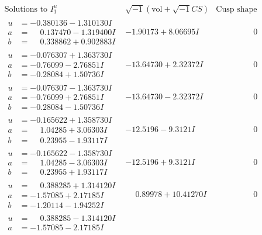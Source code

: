 \documentclass[1p]{elsarticle_modified}
\theoremstyle{definition}
\newcommand{\I}{\sqrt{-1}}
\begin{document}
$$\begin{array}{c|c|c}
\text{Solutions to }I^u_{1}& \I (\text{vol} + \sqrt{-1}CS) & \text{Cusp shape}\\
 \hline 
\begin{aligned}
u &= -0.380136 - 1.310130 I \\
a &= \phantom{-}0.137470 - 1.319400 I \\
b &= \phantom{-}0.338862 + 0.902883 I\end{aligned}
 & -1.90173 + 8.06695 I & \phantom{-0.000000 } 0 \\ \hline\begin{aligned}
u &= -0.076307 + 1.363730 I \\
a &= -0.76099 - 2.76851 I \\
b &= -0.28084 + 1.50736 I\end{aligned}
 & -13.64730 + 2.32372 I & \phantom{-0.000000 } 0 \\ \hline\begin{aligned}
u &= -0.076307 - 1.363730 I \\
a &= -0.76099 + 2.76851 I \\
b &= -0.28084 - 1.50736 I\end{aligned}
 & -13.64730 - 2.32372 I & \phantom{-0.000000 } 0 \\ \hline\begin{aligned}
u &= -0.165622 + 1.358730 I \\
a &= \phantom{-}1.04285 + 3.06303 I \\
b &= \phantom{-}0.23955 - 1.93117 I\end{aligned}
 & -12.5196 - 9.3121 I & \phantom{-0.000000 } 0 \\ \hline\begin{aligned}
u &= -0.165622 - 1.358730 I \\
a &= \phantom{-}1.04285 - 3.06303 I \\
b &= \phantom{-}0.23955 + 1.93117 I\end{aligned}
 & -12.5196 + 9.3121 I & \phantom{-0.000000 } 0 \\ \hline\begin{aligned}
u &= \phantom{-}0.388285 + 1.314120 I \\
a &= -1.57085 + 2.17185 I \\
b &= -1.20114 - 1.94252 I\end{aligned}
 & \phantom{-}0.89978 + 10.41270 I & \phantom{-0.000000 } 0 \\ \hline\begin{aligned}
u &= \phantom{-}0.388285 - 1.314120 I \\
a &= -1.57085 - 2.17185 I \\

\end{aligned}
\end{array}$$
\end{document}
